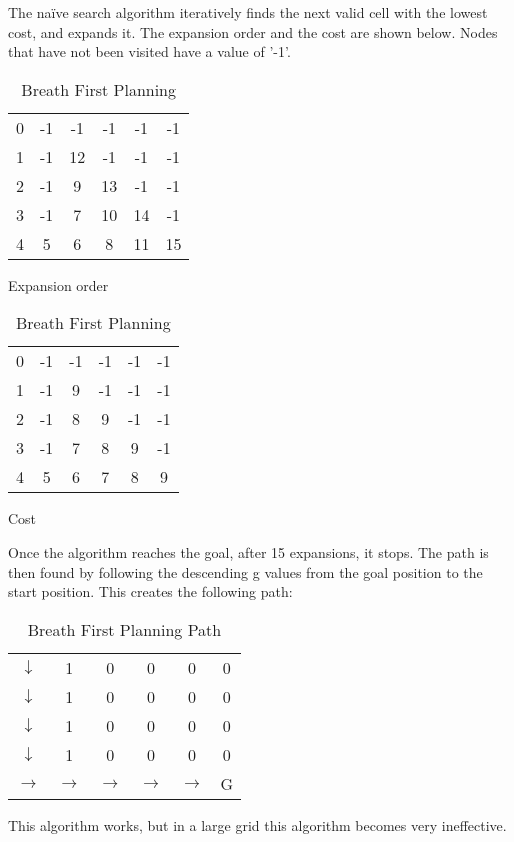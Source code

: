 \documentclass[Main]{subfiles}
\begin{document}
The naïve search algorithm iteratively finds the next valid cell with the lowest cost, and expands it. 
The expansion order and the cost are shown below. 
Nodes that have not been visited have a value of '-1'.
\begin{table}[H]
	\begin{subtable}{0.5\linewidth}
		\centering
		\begin{tabular}{cccccc}
			0 & -1 & -1 & -1 & -1 & -1  \\ 
			1 & -1 & 12 & -1 & -1 & -1  \\ 
			2 & -1 &  9 & 13 & -1 & -1  \\ 
			3 & -1 &  7 & 10 & 14 & -1  \\  
			4 &  5 &  6 &  8 & 11 & 15  \\ 
		\end{tabular}
	\caption{Expansion order}
	\label{table:expansion_order} 
	\end{subtable}
	\begin{subtable}{0.5\linewidth}
		\centering
		\begin{tabular}{cccccc}
			0 & -1 & -1 & -1 & -1 & -1  \\ 
			1 & -1 &  9 & -1 & -1 & -1  \\ 
			2 & -1 &  8 &  9 & -1 & -1  \\ 
			3 & -1 &  7 &  8 &  9 & -1  \\  
			4 &  5 &  6 &  7 &  8 &  9  \\ 
		\end{tabular}
	\caption{Cost}
	\label{table:cost_order} 
	\end{subtable}
\caption{Breath First Planning}
\end{table} \noindent
Once the algorithm reaches the goal, after 15 expansions, it stops. 
The path is then found by following the descending g values from the goal position to the start position.
This creates the following path:
\begin{table}[H]
	\centering
	\begin{tabular}{cccccc}
		$\downarrow$ & 1 & 0 & 0 & 0 & 0  \\ 
		$\downarrow$ & 1 & 0 & 0 & 0 & 0  \\ 
		$\downarrow$ & 1 & 0 & 0 & 0 & 0  \\ 
		$\downarrow$ & 1 & 0 & 0 & 0 & 0  \\  
		$\rightarrow$ & $\rightarrow$ & $\rightarrow$ & $\rightarrow$ & $\rightarrow$ & G  \\ 
	\end{tabular}
\caption{Breath First Planning Path}
\label{table:path_map} 
\end{table} \noindent
This algorithm works, but in a large grid this algorithm becomes very ineffective.
\end{document}
